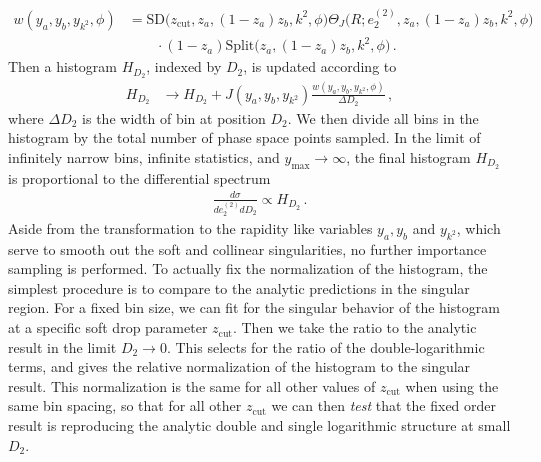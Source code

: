 \documentclass[a4paper,11pt]{article}
\newcommand{\ecf}[2]{e_{#1}^{(#2)}}
\def\zcut{z_{\text{cut}}}
\begin{document}
\begin{align}
w(y_a,y_b,y_{k^2},\phi)&=\text{SD}\Big(\zcut,z_a,(1-z_a)z_b,k^2,\phi\Big)\Theta_{J}\Big(R;\ecf{2}{2},z_a,(1-z_a)z_b,k^2,\phi\Big)\nonumber\\
&\qquad\cdot(1-z_a)\text{Split}\Big(z_a,(1-z_a)z_b,k^2,\phi\Big)\,.
\end{align}
Then a histogram $H_{D_2}$, indexed by $D_2$, is updated according to
\begin{align}
H_{D_2}&\rightarrow H_{D_2}+J(y_a,y_b,y_{k^2})\frac{w(y_a,y_b,y_{k^2},\phi)}{\Delta D_2}\,,
\end{align}
where $\Delta D_2$ is the width of bin at position $D_2$.
We then divide all bins in the histogram by the total number of phase space points sampled. In the limit of infinitely narrow bins, infinite statistics, and $y_{\text{max}}\rightarrow\infty$, the final histogram $H_{D_2}$ is proportional to the differential spectrum
\begin{align}
\frac{d\sigma}{d\ecf{2}{2} dD_2}\propto H_{D_2}\,.
\end{align}
Aside from the transformation to the rapidity like variables $y_{a},y_{b}$ and $y_{k^2}$, which serve to smooth out the soft and collinear singularities, no further importance sampling is performed. To actually fix the normalization of the histogram, the simplest procedure is to compare to the analytic predictions in the singular region. For a fixed bin size, we can fit for the singular behavior of the histogram at a specific soft drop parameter $z_{\text{cut}}$. Then we take the ratio to the analytic result in the limit $D_2\rightarrow 0$. This selects for the ratio of the double-logarithmic terms, and gives the relative normalization of the histogram to the singular result. This normalization is the same for all other values of $z_{\text{cut}}$ when using the same bin spacing, so that for all other $z_{\text{cut}}$ we can then \emph{test} that the fixed order result is reproducing the analytic double and single logarithmic structure at small $D_2$.
 
\end{document}
